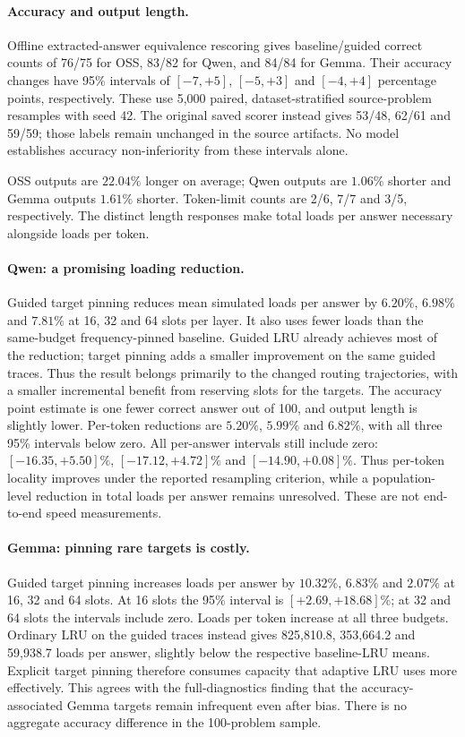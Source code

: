 \paragraph{Accuracy and output length.}
Offline extracted-answer equivalence rescoring gives baseline/guided
correct counts of 76/75 for OSS, 83/82 for Qwen, and 84/84 for Gemma.
Their accuracy changes have 95\% intervals of $[-7,+5]$, $[-5,+3]$ and
$[-4,+4]$ percentage points, respectively. These use 5,000 paired,
dataset-stratified source-problem resamples with seed 42. The original
saved scorer instead gives 53/48, 62/61 and 59/59; those labels remain
unchanged in the source artifacts. No model establishes accuracy
non-inferiority from these intervals alone.

OSS outputs are $22.04\%$ longer on average; Qwen outputs are $1.06\%$
shorter and Gemma outputs $1.61\%$ shorter. Token-limit counts are 2/6,
7/7 and 3/5, respectively. The distinct length responses make total loads
per answer necessary alongside loads per token.



\paragraph{Qwen: a promising loading reduction.}
Guided target pinning reduces mean simulated loads per answer by
$6.20\%$, $6.98\%$ and $7.81\%$ at 16, 32 and 64 slots per layer.
It also uses fewer loads than the same-budget frequency-pinned baseline.
Guided LRU already achieves most of the reduction; target pinning adds a
smaller improvement on the same guided traces. Thus the result belongs
primarily to the changed routing trajectories, with a smaller incremental
benefit from reserving slots for the targets. The accuracy point estimate
is one fewer correct answer out of 100, and output length is slightly lower.
Per-token reductions are $5.20\%$, $5.99\%$ and $6.82\%$, with
all three 95\% intervals below zero. All per-answer intervals still
include zero: $[-16.35,+5.50]\%$, $[-17.12,+4.72]\%$ and
$[-14.90,+0.08]\%$. Thus per-token locality improves under the reported
resampling criterion, while a population-level reduction in total loads
per answer remains unresolved. These are not end-to-end speed measurements.

\paragraph{Gemma: pinning rare targets is costly.}
Guided target pinning increases loads per answer by $10.32\%$, $6.83\%$
and $2.07\%$ at 16, 32 and 64 slots. At 16 slots the 95\% interval is
$[+2.69,+18.68]\%$; at 32 and 64 slots the intervals include zero.
Loads per token increase at all three budgets. Ordinary LRU on the guided
traces instead gives 825,810.8, 353,664.2 and 59,938.7 loads per answer,
slightly below the respective baseline-LRU means. Explicit target pinning
therefore consumes capacity that adaptive LRU uses more effectively.
This agrees with the full-diagnostics finding that the accuracy-associated
Gemma targets remain infrequent even after bias. There is no aggregate
accuracy difference in the 100-problem sample.

